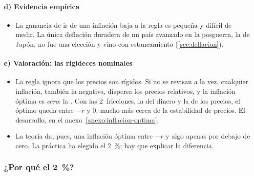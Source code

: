 \documentclass[11pt]{article}
\begin{document}
\paragraph{d) Evidencia empírica}

\begin{itemize}
\item La ganancia de ir de una inflación baja a la regla es pequeña y difícil de medir\nocite{Lucas2000Inflation}. La única deflación duradera de un país avanzado en la posguerra, la de Japón, no fue una elección y vino con estancamiento (\ref{sec:deflacion}).
\end{itemize}

\paragraph{e) Valoración: las rigideces nominales}

\begin{itemize}
\item La regla ignora que los precios son rígidos. Si no se revisan a la vez, cualquier inflación, también la negativa, dispersa los precios relativos, y la inflación óptima es \emph{cero}: la \nocite{Woodford2003Interest}. Con las 2~fricciones, la del dinero y la de los precios, el óptimo queda entre $-r$ y 0, mucho más cerca de la estabilidad de precios\nocite{SchmittGroheUribe2010Optimal}. El desarrollo, en el anexo~\ref{anexo:inflacion-optima}.
\item La teoría da, pues, una inflación óptima entre $-r$ y algo apenas por debajo de cero. La práctica ha elegido el 2~\%: hay que explicar la diferencia.
\end{itemize}

\subsubsection{¿Por qué el 2~\%?}\label{sec:dos-por-ciento}
\end{document}

